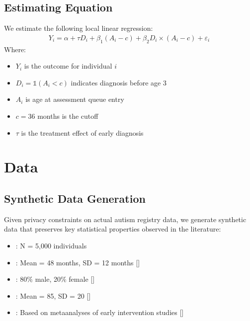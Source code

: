 \documentclass[letterpaper,10pt,english]{jupyterBook}
\begin{document}
\subsection{Estimating Equation}
\label{\detokenize{methodology:estimating-equation}}
\sphinxAtStartPar
We estimate the following local linear regression:
\begin{equation*}
\begin{split}Y_i = \alpha + \tau D_i + \beta_1 (A_i - c) + \beta_2 D_i \times (A_i - c) + \varepsilon_i\end{split}
\end{equation*}
\sphinxAtStartPar
Where:
\begin{itemize}
\item {} 
\sphinxAtStartPar
\(Y_i\) is the outcome for individual \(i\)

\item {} 
\sphinxAtStartPar
\(D_i = \mathbb{1}(A_i < c)\) indicates diagnosis before age 3

\item {} 
\sphinxAtStartPar
\(A_i\) is age at assessment queue entry

\item {} 
\sphinxAtStartPar
\(c = 36\) months is the cutoff

\item {} 
\sphinxAtStartPar
\(\tau\) is the treatment effect of early diagnosis

\end{itemize}


\section{Data}
\label{\detokenize{methodology:data}}

\subsection{Synthetic Data Generation}
\label{\detokenize{methodology:synthetic-data-generation}}
\sphinxAtStartPar
Given privacy constraints on actual autism registry data, we generate synthetic data that preserves key statistical properties observed in the literature:
\begin{itemize}
\item {} 
\sphinxAtStartPar
{}: N = 5,000 individuals

\item {} 
\sphinxAtStartPar
{}: Mean = 48 months, SD = 12 months {[}{]}

\item {} 
\sphinxAtStartPar
{}: 80\% male, 20\% female {[}{]}

\item {} 
\sphinxAtStartPar
{}: Mean = 85, SD = 20 {[}{]}

\item {} 
\sphinxAtStartPar
{}: Based on meta\sphinxhyphen{}analyses of early intervention studies {[}{]}

\end{itemize}
\end{document}
